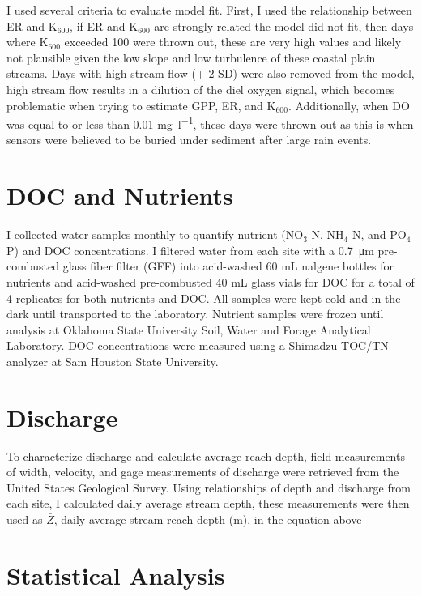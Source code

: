I used several criteria to evaluate model fit. First, I used the relationship between ER and K$_{600}$, if ER and K$_{600}$ are strongly related the model did not fit, then days where K$_{600}$ exceeded 100 were thrown out, these are very high values and likely not plausible given the low slope and low turbulence of these coastal plain streams. Days with high stream flow (+ 2 SD) were also removed from the model, high stream flow results in a dilution of the diel oxygen signal, which becomes problematic when trying to estimate GPP, ER, and K$_{600}$. Additionally, when DO was equal to or less than 0.01 \unit{\mg\per\l}, these days were thrown out as this is when sensors were believed to be buried under sediment after large rain events. 


\section{DOC and Nutrients}
I collected water samples monthly to quantify nutrient (NO$_3$-N, NH$_4$-N, and PO$_4$-P) and DOC concentrations. I filtered water from each site with a \qty{0.7}{\um} pre-combusted glass fiber filter (GFF) into acid-washed 60 mL nalgene bottles for nutrients and acid-washed pre-combusted 40 mL glass vials for DOC for a total of 4 replicates for both nutrients and DOC. All samples were kept cold and in the dark until transported to the laboratory. Nutrient samples were frozen until analysis at Oklahoma State University Soil, Water and Forage Analytical Laboratory. DOC concentrations were measured using a Shimadzu TOC/TN analyzer at Sam Houston State University.  

\section{Discharge}
To characterize discharge and calculate average reach depth, field measurements of width, velocity, and gage measurements of discharge were retrieved from the United States Geological Survey. Using relationships of depth and discharge from each site, I calculated daily average stream depth, these measurements were then used as $\bar{Z}$, daily average stream reach depth (m), in the equation above \cite{dataRetrival, surveyUSGSWaterData1994, raymond_scaling_2012}

\section{Statistical Analysis}


